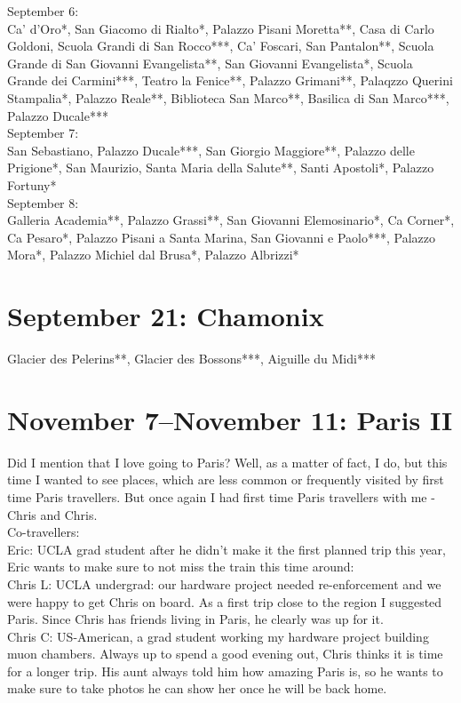 September 6:\\
Ca' d'Oro*, San Giacomo di Rialto*, Palazzo Pisani Moretta**, Casa di Carlo Goldoni, Scuola Grandi di San Rocco***, Ca' Foscari, San Pantalon**, Scuola Grande di San Giovanni Evangelista**, San Giovanni Evangelista*, Scuola Grande dei Carmini***, Teatro la Fenice**, Palazzo Grimani**, Palaqzzo Querini Stampalia*, Palazzo Reale**, Biblioteca San Marco**,  Basilica di San Marco***, Palazzo Ducale***\\

September 7:\\
San Sebastiano, Palazzo Ducale***, San Giorgio Maggiore**, Palazzo delle Prigione*, San Maurizio, Santa Maria della Salute**, Santi Apostoli*,  Palazzo Fortuny*\\

September 8:\\
Galleria Academia**, Palazzo Grassi**, San Giovanni Elemosinario*, Ca Corner*, Ca Pesaro*, Palazzo Pisani a Santa Marina, San Giovanni e Paolo***, Palazzo Mora*, Palazzo Michiel dal Brusa*, Palazzo Albrizzi*

\section{September 21: Chamonix}
\label{Chamonix2013}

Glacier des Pelerins**, Glacier des Bossons***, Aiguille du Midi***

\section{November 7--November 11: Paris II}
\label{2013ParisII}

Did I mention that I love going to Paris? Well, as a matter of fact, I do, but this time I wanted to see places, which are less common or frequently visited by first time Paris travellers. But once again I had first time Paris travellers with me - Chris and Chris.\\

Co-travellers:\\
Eric: UCLA grad student after he didn't make it the first planned trip this year, Eric wants to make sure to not miss the train this time around:\\
Chris L: UCLA undergrad: our hardware project needed re-enforcement and we were happy to get Chris on board. As a first trip close to the region I suggested Paris. Since Chris has friends living in Paris, he clearly was up for it.\\
Chris C: US-American, a grad student working my hardware project building muon chambers. Always up to spend a good evening out, Chris thinks it is time for a longer trip. His aunt always told him how amazing Paris is, so he wants to make sure to take photos he can show her once he will be back home.\\

